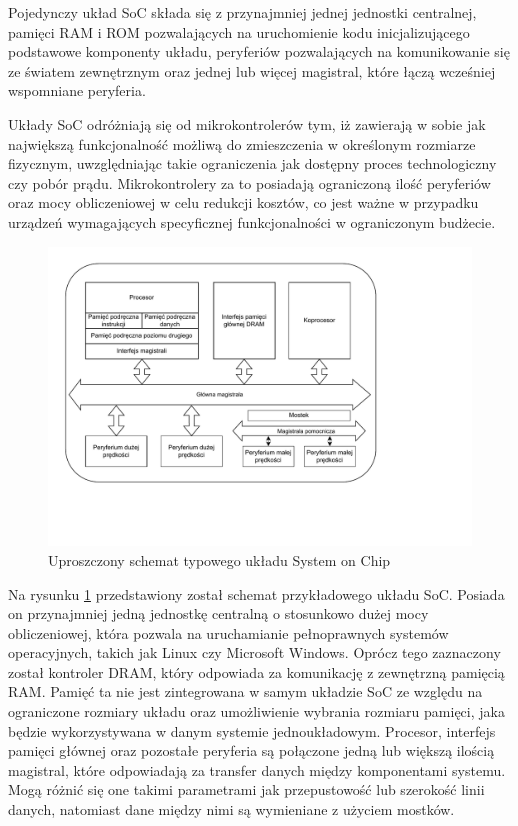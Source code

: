 Pojedynczy układ SoC składa się z przynajmniej jednej jednostki centralnej, pamięci RAM i ROM pozwalających na uruchomienie kodu inicjalizującego podstawowe komponenty układu, peryferiów pozwalających na komunikowanie się ze światem zewnętrznym oraz jednej lub więcej magistral, które łączą wcześniej wspomniane peryferia.

Układy SoC odróżniają się od mikrokontrolerów tym, iż zawierają w sobie jak największą funkcjonalność możliwą do zmieszczenia w określonym rozmiarze fizycznym, uwzględniając takie ograniczenia jak dostępny proces technologiczny czy pobór prądu. Mikrokontrolery za to posiadają ograniczoną ilość peryferiów oraz mocy obliczeniowej w celu redukcji kosztów, co jest ważne w przypadku urządzeń wymagających specyficznej funkcjonalności w ograniczonym budżecie.

\begin{figure}[H]
\centering
\includegraphics[scale=0.7,trim={0 3cm 3cm 0.3cm},clip]{soc-theory/diag-soc-schem.pdf}
\caption{Uproszczony schemat typowego układu System on Chip}
\label{fig:soc-schem}
\end{figure}

Na rysunku \ref{fig:soc-schem} przedstawiony został schemat przykładowego układu SoC. Posiada on przynajmniej jedną jednostkę centralną o stosunkowo dużej mocy obliczeniowej, która pozwala na uruchamianie pełnoprawnych systemów operacyjnych, takich jak Linux czy Microsoft Windows. Oprócz tego zaznaczony został kontroler DRAM, który odpowiada za komunikację z zewnętrzną pamięcią RAM. Pamięć ta nie jest zintegrowana w samym układzie SoC ze względu na ograniczone rozmiary układu oraz umożliwienie wybrania rozmiaru pamięci, jaka będzie wykorzystywana w danym systemie jednoukładowym. Procesor, interfejs pamięci głównej oraz pozostałe peryferia są połączone jedną lub większą ilością magistral, które odpowiadają za transfer danych między komponentami systemu. Mogą różnić się one takimi parametrami jak przepustowość lub szerokość linii danych, natomiast dane między nimi są wymieniane z użyciem mostków.

